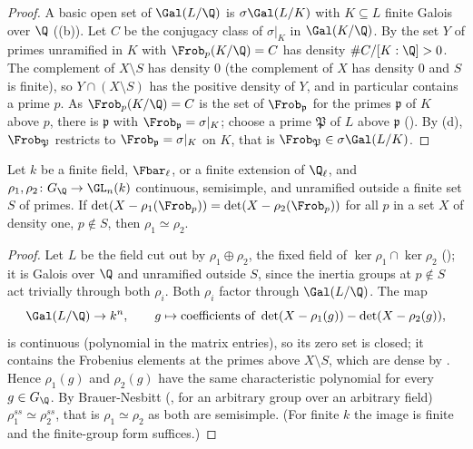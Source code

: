\begin{proof}
A basic open set of $\Gal(L/\Q)$ is $\sigma\Gal(L/K)$ with $K\subseteq L$ finite Galois over $\Q$ ((b)). Let $C$ be the conjugacy class of
$\sigma|_K$ in $\Gal(K/\Q)$. By  the set $Y$ of primes unramified in $K$ with $\Frob_p(K/\Q)=C$ has density $\#C/[K:\Q]>0$. The complement of
$X\setminus S$ has density $0$ (the complement of $X$ has density $0$ and $S$ is finite), so $Y\cap(X\setminus S)$ has the positive density of $Y$, and in particular contains
a prime $p$. As $\Frob_p(K/\Q)=C$ is the set of $\Frob_{\mathfrak p}$ for the primes $\mathfrak p$ of $K$ above $p$, there is $\mathfrak p$ with $\Frob_{\mathfrak p}=\sigma|_K$; choose a
prime $\mathfrak P$ of $L$ above $\mathfrak p$ (). By (d), $\Frob_{\mathfrak P}$ restricts to $\Frob_{\mathfrak p}=\sigma|_K$ on $K$, that is
$\Frob_{\mathfrak P}\in\sigma\Gal(L/K)$.
\end{proof}

\begin{corollary}\label{cor:galois:chebotarev-bn}
Let $k$ be a finite field, $\Fbar_\ell$, or a finite extension of $\Q_\ell$, and $\rho_1,\rho_2\colon G_\Q\to\GL_n(k)$ continuous, semisimple, and unramified outside a finite
set $S$ of primes. If $\det(X-\rho_1(\Frob_p))=\det(X-\rho_2(\Frob_p))$ for all $p$ in a set $X$ of density one, $p\notin S$, then $\rho_1\simeq\rho_2$.
\end{corollary}

\begin{proof}
Let $L$ be the field cut out by $\rho_1\oplus\rho_2$, the fixed field of $\ker\rho_1\cap\ker\rho_2$ (); it is Galois over $\Q$ and unramified
outside $S$, since the inertia groups at $p\notin S$ act trivially through both $\rho_i$. Both $\rho_i$ factor through $\Gal(L/\Q)$. The map
\[
\Gal(L/\Q)\to k^n,\qquad g\mapsto\text{coefficients of }\det(X-\rho_1(g))-\det(X-\rho_2(g)),
\]
is continuous (polynomial in the matrix entries), so its zero set is closed; it contains the Frobenius elements at the primes above $X\setminus S$, which are dense by
. Hence $\rho_1(g)$ and $\rho_2(g)$ have the same characteristic polynomial for every $g\in G_\Q$. By Brauer-Nesbitt (, for an
arbitrary group over an arbitrary field) $\rho_1^{ss}\simeq\rho_2^{ss}$, that is $\rho_1\simeq\rho_2$ as both are semisimple. (For finite $k$ the image is finite and
the finite-group form suffices.)
\end{proof}

